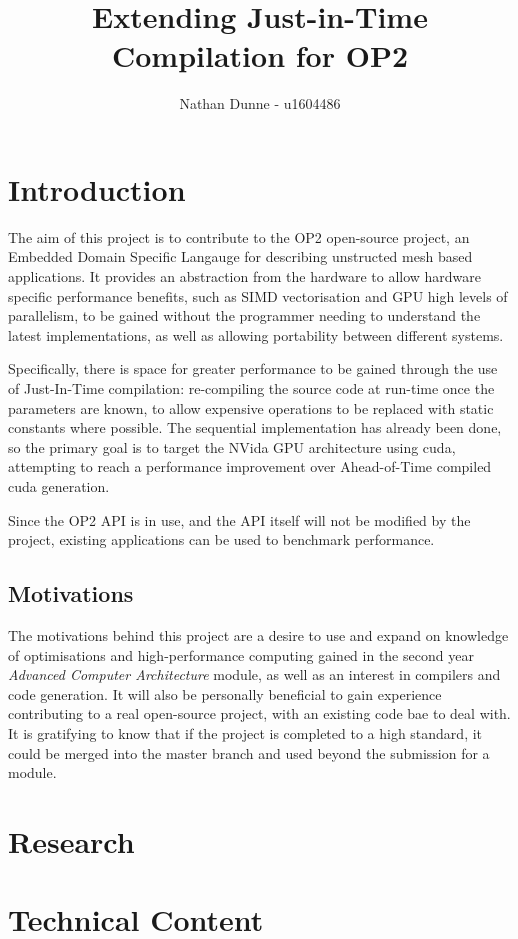 \documentclass[11pt]{article}
\title{Extending Just-in-Time Compilation for OP2}
\author{Nathan Dunne - u1604486}
\begin{document}
\maketitle

\section*{Introduction}
The aim of this project is to contribute to the OP2 open-source project, an Embedded Domain Specific Langauge for describing unstructed mesh based applications. It provides an abstraction from the hardware to allow hardware specific performance benefits, such as SIMD vectorisation and GPU high levels of parallelism, to be gained without the programmer needing to understand the latest implementations, as well as allowing portability between different systems.
\par Specifically, there is space for greater performance to be gained through the use of Just-In-Time compilation: re-compiling the source code at run-time once the parameters are known, to allow expensive operations to be replaced with static constants where possible. The sequential implementation has already been done, so the primary goal is to target the NVida GPU architecture using cuda, attempting to reach a performance improvement over Ahead-of-Time compiled cuda generation.
\par Since the OP2 API is in use, and the API itself will not be modified by the project, existing applications can be used to benchmark performance.
\subsection*{Motivations}
The motivations behind this project are a desire to use and expand on knowledge of optimisations and high-performance computing gained in the second year \textit{Advanced Computer Architecture} module, as well as an interest in compilers and code generation. It will also be personally beneficial to gain experience contributing to a real open-source project, with an existing code bae to deal with. It is gratifying to know that if the project is completed to a high standard, it could be merged into the master branch and used beyond the submission for a module.
\section*{Research}

\section*{Technical Content}
\end{document}

